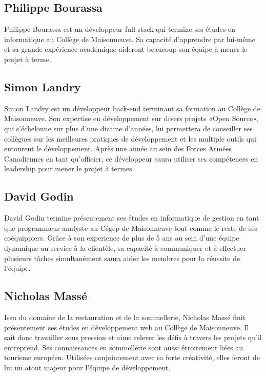 \documentclass{scrreprt}
\begin{document}
\subsection{Philippe Bourassa}

Philippe Bourassa est un développeur full-stack qui termine ses études en
informatique au Collège de Maisonneuve. Sa capacité d'apprendre par lui-même et
sa grande expérience académique aideront beaucoup son équipe à mener le projet à
terme.

\newpage

\subsection{Simon Landry}

Simon Landry est un développeur back-end terminant sa formation au Collège de
Maisonneuve. Son expertise en développement sur divers projets «Open Source»,
qui s'échelonne sur plus d'une dizaine d'années, lui permettera de conseiller
ses collègues sur les meilleures pratiques de développement et les multiple
outils qui entourent le développement. Après une année au sein des
Forces Armées Canadiennes en tant qu'officier, ce développeur saura utiliser ses
compétences en leadership pour mener le projet à termes.

\subsection{David Godin}

David Godin termine présentement ses études en informatique de gestion en tant
que programmeur analyste au Cégep de Maisonneuve tout comme le reste de ses
coéquippiers. Grâce à son experience de plus de 5 ans au sein d'une équipe
dynamique au service à la clientèle, sa capacité à communiquer et à effectuer
plusieurs tâches simultanément saura aider les membres pour la réussite de
l'équipe.

\subsection{Nicholas Massé}

Issu du domaine de la restauration et de la sommellerie, Nicholas Massé finit
présentement ses études en développement web au Collège de Maisonneuve.
Il sait donc travailler sous pression et aime relever les défis à travers les
projets qu'il entreprend. Ses connaissances en sommellerie sont aussi
étroitement liées au tourisme européen. Utilisées conjointement avec sa forte
créativité, elles feront de lui un atout majeur pour l'équipe de développement.
\end{document}
